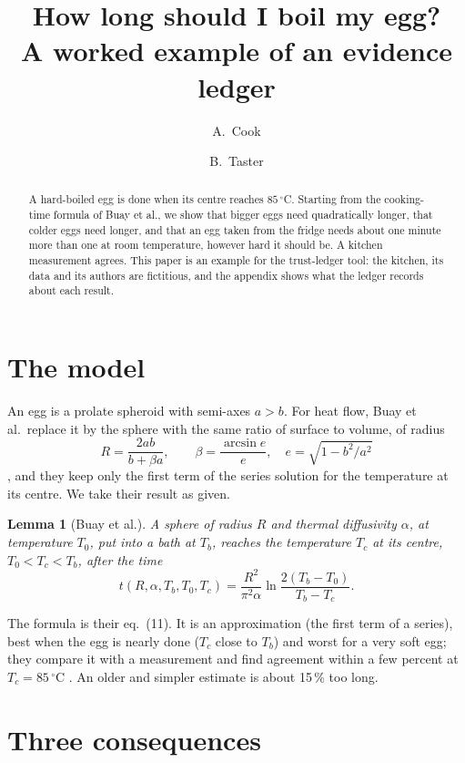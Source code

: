 \documentclass[11pt]{article}
\title{How long should I boil my egg?\\\large A worked example of an evidence ledger\ledgertitlenote}
\author{A.~Cook \and B.~Taster}
\date{}
\newtheorem{lemma}[theorem]{Lemma}
\begin{document}
\maketitle

\begin{abstract}
A hard-boiled egg is done when its centre reaches $85\,^\circ$C. Starting from the cooking-time formula of
Buay et al., we show that bigger eggs need quadratically longer, that colder eggs need longer, and that an egg
taken from the fridge needs about one minute more than one at room temperature, however hard it should be.
A kitchen measurement agrees. This paper is an example for the trust-ledger tool: the kitchen, its data and
its authors are fictitious, and the appendix shows what the ledger records about each result.
\end{abstract}

\section{The model}

An egg is a prolate spheroid with semi-axes $a > b$. For heat flow, Buay et al.\ replace it by the sphere with
the same ratio of surface to volume, of radius
\begin{equation}\label{eq:radius}
  R = \frac{2ab}{b + \beta a}, \qquad \beta = \frac{\arcsin e}{e}, \quad e = \sqrt{1 - b^2/a^2}
\end{equation}
\cite[eq.~(22)]{Buay2006}, and they keep only the first term of the series solution for the temperature at its
centre. We take their result as given.

\begin{lemma}[Buay et al.]\label{lem:firstorder}
  A sphere of radius $R$ and thermal diffusivity $\alpha$, at temperature $T_0$, put into a bath at $T_b$,
  reaches the temperature $T_c$ at its centre, $T_0 < T_c < T_b$, after the time
  \[ t(R, \alpha, T_b, T_0, T_c) = \frac{R^2}{\pi^2 \alpha} \ln \frac{2 (T_b - T_0)}{T_b - T_c}. \]
\end{lemma}

The formula is their eq.~(11). It is an approximation (the first term of a series), best when the egg is
nearly done ($T_c$ close to $T_b$) and worst for a very soft egg; they compare it with a measurement and
find agreement within a few percent at $T_c = 85\,^\circ$C \cite{Buay2006}. An older and simpler estimate
\cite{Roura2000} is about 15\,\% too long.

\section{Three consequences}
\end{document}
